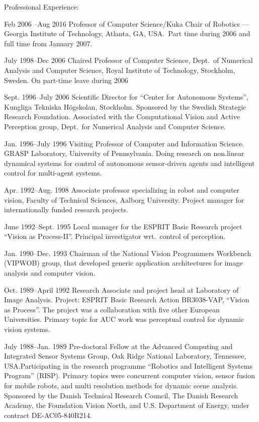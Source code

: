 \documentclass{article}
\begin{document}
\begin{cv}
\begin{cvlist}{Professional Experience:}
\item[Feb 2006 --Aug 2016]  Professor of Computer Science/Kuka
  Chair of Robotics --- Georgia Institute of Technology, Atlanta, GA,
  USA.\ Part time during 2006 and full time from January 2007.

\item[July 1998--Dec 2006] Chaired Professor of Computer Science,
  Dept.\ of Numerical Analysis and Computer Science, Royal Institute
  of Technology, Stockholm, Sweden. On part-time leave during 2006

\item[Sept. 1996--July 2006] Scientific Director for ``Center for
  Autonomous Systems'', Kungliga Tek\-ni\-ska H\"og\-skolan,
  Stock\-holm.  Sponsored by the Swedish Strategic Research
  Foundation. Associated with the Computational Vision and Active
  Perception group, Dept.~for Numerical Analysis and Computer
  Science.

\item[Jan. 1996--July 1996] Visiting Professor of Computer and
  Information Science.  GRASP Laboratory, University of Pennsylvania.
  Doing research on non.linear dynamical systems for control of
  autonomous sensor-driven agents and intelligent control for
  multi-agent systems.

\item[Apr. 1992--Aug. 1998] Associate professor specializing in robot
  and computer vision, Faculty of Technical Sciences, Aalborg
  University.  Project manager for internationally funded research
  projects.

\item[June 1992--Sept. 1995] Local manager for the ESPRIT Basic
  Research project ``Vision as Process-II''.  Principal investigator
  wrt.\ control of perception.

  \item[Jan. 1990--Dec. 1993] Chairman of the National Vision Programmers
  Workbench (VIPWOB) group, that developed generic application architectures for
  image analysis and computer vision.

  \item[Oct. 1989--April 1992] Research Associate and project head at Laboratory
  of Image Analysis. Project: ESPRIT Basic Research Action BR3038-VAP, ``Vision
  as Process''. The project was a collaboration with five other European
  Universities. Primary topic for AUC work was perceptual control for dynamic
  vision systems.

  \item[July 1988--Jan. 1989] Pre-doctoral Fellow at the Advanced Computing and
  Integrated Sensor Systems Group, Oak Ridge National Laboratory, Tennessee,
  USA.\@ Participating in the research programme ``Robotics and Intelligent
  Systems Program'' (RISP). Primary topics were concurrent computer vision,
  sensor fusion for mobile robots, and multi resolution methods for dynamic
  scene analysis. Sponsored by the Danish Technical Research Council, The Danish
  Research Academy, the Foundation Vision North, and U.S. Department of Energy,
  under contract DE-AC05-840R214.\@


\end{cvlist}
\end{cv}
\end{document}
